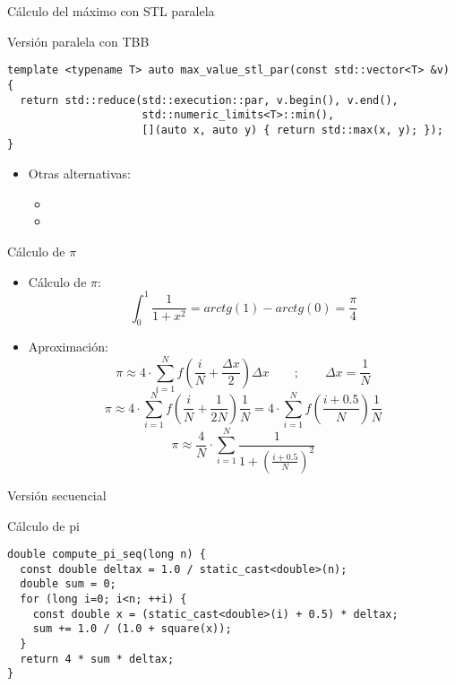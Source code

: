 \begin{frame}[t,fragile]{Cálculo del máximo con STL paralela}
\begin{block}{Versión paralela con TBB}
\begin{lstlisting}
template <typename T> auto max_value_stl_par(const std::vector<T> &v) {
  return std::reduce(std::execution::par, v.begin(), v.end(),
                     std::numeric_limits<T>::min(),
                     [](auto x, auto y) { return std::max(x, y); });
}
\end{lstlisting}
\end{block}
\begin{itemize}
  \item Otras alternativas:
    \begin{itemize}
      \item {}
      \item {}
    \end{itemize}
\end{itemize}
\end{frame}

\begin{frame}[t]{Cálculo de $\pi$}
\begin{itemize}
  \item Cálculo de $\pi$:
\[
\int_0^1 \frac{1}{1+x^2} = arctg(1) - arctg(0) = \frac{\pi}{4}
\]

  \item Aproximación:
\[
\pi \approx 4 \cdot \sum_{i=1}^N f(\frac{i}{N} + \frac{\Delta x}{2} ) \Delta x
\qquad;\qquad 
\Delta x = \frac{1}{N}
\]
\[
\pi \approx 4 \cdot \sum_{i=1}^N f(\frac{i}{N} + \frac{1}{2N}) \frac{1}{N} = 
4 \cdot \sum_{i=1}^N f(\frac{i+0.5}{N}) \frac{1}{N}
\]
\[
\pi \approx \frac{4}{N} \cdot \sum_{i=1}^N \frac{1}{1 + (\frac{i+0.5}{N})^2}
\]

\end{itemize}
\end{frame}

\begin{frame}[t,fragile]{Versión secuencial}
\begin{block}{Cálculo de pi}
\begin{lstlisting}
double compute_pi_seq(long n) {
  const double deltax = 1.0 / static_cast<double>(n);
  double sum = 0;
  for (long i=0; i<n; ++i) {
    const double x = (static_cast<double>(i) + 0.5) * deltax;
    sum += 1.0 / (1.0 + square(x));
  }
  return 4 * sum * deltax;
}
\end{lstlisting}
\end{block}
\end{frame}

